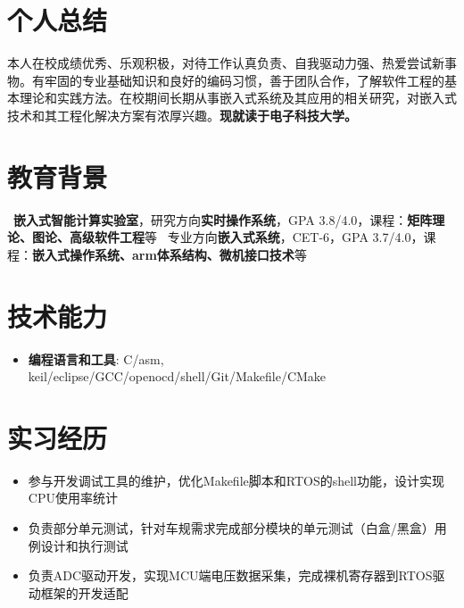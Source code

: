 \documentclass{resume}
\begin{document}


 
\section{个人总结}
本人在校成绩优秀、乐观积极，对待工作认真负责、自我驱动力强、热爱尝试新事物。有牢固的专业基础知识和良好的编码习惯，善于团队合作，了解软件工程的基本理论和实践方法。在校期间长期从事嵌入式系统及其应用的相关研究，对嵌入式技术和其工程化解决方案有浓厚兴趣。\textbf{现就读于电子科技大学。}

\section{教育背景}
\ \textbf{嵌入式智能计算实验室}，研究方向\textbf{实时操作系统}，GPA 3.8/4.0，课程：\textbf{矩阵理论、图论、高级软件工程}等
\ 专业方向\textbf{嵌入式系统}，CET-6，GPA 3.7/4.0，课程：\textbf{嵌入式操作系统、arm体系结构、微机接口技术}等

\section{技术能力}
\begin{itemize}[parsep=0.2ex]
  \item \textbf{编程语言和工具}: C/asm, keil/eclipse/GCC/openocd/shell/Git/Makefile/CMake
\end{itemize}


\section{实习经历}
\begin{itemize}
  \item 参与开发调试工具的维护，优化Makefile脚本和RTOS的shell功能，设计实现CPU使用率统计
  \item 负责部分单元测试，针对车规需求完成部分模块的单元测试（白盒/黑盒）用例设计和执行测试
  \item 负责ADC驱动开发，实现MCU端电压数据采集，完成裸机寄存器到RTOS驱动框架的开发适配
\end{itemize}
\end{document}

